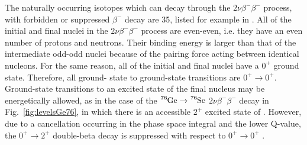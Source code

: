 The naturally occurring isotopes which can decay through the $2\nu\beta^-\beta^-$ process, with forbidden or suppressed $\beta^-$ decay are 35, listed for example in \cite{Giunti:2007ry}. All of the initial and final nuclei in the $2\nu\beta^-\beta^-$ process are even-even, i.e. they have an even number of protons and neutrons. Their binding energy is larger than that of the intermediate odd-odd nuclei because of the pairing force acting between identical nucleons. For the same reason, all of the initial and final nuclei have a $0^+$ ground state. Therefore, all ground- state to ground-state transitions are $0^+\rightarrow0^+$. Ground-state transitions to an excited state of the final nucleus may be energetically allowed, as in the case of the $\ce{^{76}Ge}\rightarrow\ce{^{76}Se}$ $2\nu\beta^-\beta^-$ decay in Fig.~\ref{fig:levelsGe76}, in which there is an accessible $2^+$ excited state of . However, due to a cancellation occurring in the phase space integral and the lower Q-value, the $0^+\rightarrow2^+$ double-beta decay is suppressed with respect to $0^+\rightarrow0^+$ \cite{Tomoda:1991}.

